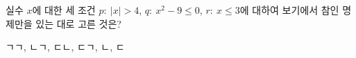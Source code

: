 실수 $x$에 대한 세 조건 $p:\ |x|>4$, $q:\ x^2-9\le 0$, $r:\ x\le 3$에 대하여 보기에서 참인 명제만을 있는 대로 고른 것은? 
\begin{choices32}{ㄱ}{ㄱ, ㄴ}{ㄱ, ㄷ}{ㄴ, ㄷ}{ㄱ, ㄴ, ㄷ}\end{choices32}
